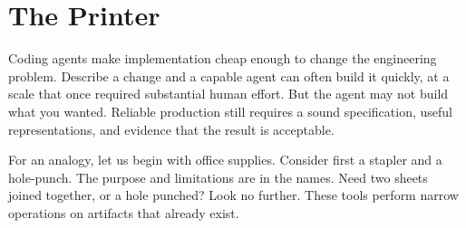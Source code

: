 



\chapter{The Printer}


Coding agents make implementation cheap enough to change the engineering problem. Describe a change and a capable agent can often build it quickly, at a scale that once required substantial human effort. But the agent may not build what you wanted. Reliable production still requires a sound specification, useful representations, and evidence that the result is acceptable.



For an analogy, let us begin with office supplies. Consider first a stapler and a hole-punch. The purpose and limitations are in the names. Need two sheets joined together, or a hole punched? Look no further. These tools perform narrow operations on artifacts that already exist.

